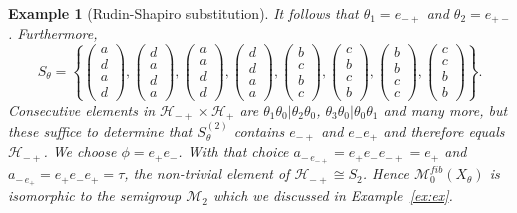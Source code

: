 \documentclass[10pt,a4paper]{amsart}
\newtheorem{example}[theorem]{Example}
\numberwithin{equation}{section}
\newcommand{\Hh}{{\mathcal H}}
\newcommand{\M}{\mathcal M}
\newcommand{\Sfib}{\M^{fib}_0(X_\theta)}
\renewcommand{\a}{{\color{blue}\boxdot}}
\renewcommand{\c}{{\color{red}\boxminus}}
\renewcommand{\b}{{\color{orange}\boxplus}}
\begin{document}
\begin{example}[Rudin-Shapiro substitution]
It follows that $\theta_1 = e_{-+}$ and $\theta_2=e_{+-}$. Furthermore,
\[S_\theta = \left\{  \begin{pmatrix} a\\d\\a\\d \end{pmatrix}, \begin{pmatrix} d\\a\\d\\a \end{pmatrix},   \begin{pmatrix} a\\a\\d\\d \end{pmatrix},  \begin{pmatrix} d\\d\\a\\a \end{pmatrix}, \begin{pmatrix} 
b\\c\\b\\c \end{pmatrix}, \begin{pmatrix} 
c\\b\\c\\b \end{pmatrix},  \begin{pmatrix} b\\b\\c\\c \end{pmatrix},  \begin{pmatrix} c\\c\\b\\b \end{pmatrix}  \right\}.\]
Consecutive elements in $\Hh_{-+}\times \Hh_+$ are $\theta_1\theta_0|\theta_2\theta_0$, $\theta_3\theta_0|\theta_0\theta_1$ and many more, but these suffice to determine that
$S^{(2)}_\theta$ contains $e_{-+}$ and $e_-e_+$ and therefore equals $\Hh_{-+}$. We choose $\phi = e_+ e_-$. With that choice
$a_{-\,e_{-+}} = e_+ e_- e_{-+} = e_+$ and $a_{-\,e_{+}} = e_+ e_- e_{+} =\tau$, the non-trivial element of $\Hh_{-+}\cong S_2$. Hence $\Sfib$ is isomorphic to the semigroup $\mathcal M_2$ which we discussed in Example~\ref{ex:ex}.
\end{example}
\end{document}
